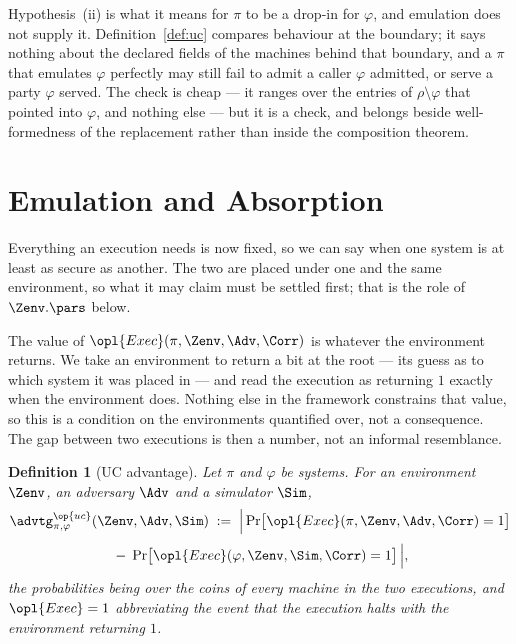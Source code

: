 \documentclass[10pt,oneside,openany]{book}
\theoremstyle{accentdef}
\newtheorem{definition}{Definition}[chapter]
\theoremstyle{accentplain}
\begin{document}
Hypothesis~(ii) is what it means for $\pi$ to be a drop-in for $\varphi$, and emulation does not
supply it. Definition~\ref{def:uc} compares behaviour at the boundary; it says nothing about the
declared fields of the machines behind that boundary, and a $\pi$ that emulates $\varphi$
perfectly may still fail to admit a caller $\varphi$ admitted, or serve a party $\varphi$ served.
The check is cheap --- it ranges over the entries of $\rho \setminus \varphi$ that pointed into
$\varphi$, and nothing else --- but it is a check, and belongs beside well-formedness of the
replacement rather than inside the composition theorem.

\section{Emulation and Absorption}\label{sec:emabs}


Everything an execution needs is now fixed, so we can say when one system is at least as secure
as another. The two are placed under one and the same environment, so what it may claim must be
settled first; that is the role of $\Zenv.\pars$ below.

The value of $\opl{Exec}(\pi,\Zenv,\Adv,\Corr)$ is whatever the environment returns. We take an
environment to return a bit at the root --- its guess as to which system it was placed in --- and
read the execution as returning $1$ exactly when the environment does. Nothing else in the
framework constrains that value, so this is a condition on the environments quantified over, not a
consequence. The gap between two executions is then a number, not an informal resemblance.

\begin{definition}[UC advantage]\label{def:adv}
Let $\pi$ and $\varphi$ be systems. For an environment $\Zenv$, an adversary $\Adv$ and a simulator $\Sim$,
\[
  \begin{gathered}
  \advtg^{\op{uc}}_{\pi,\varphi}(\Zenv,\Adv,\Sim)
  \;:=\;
  \Bigl|\, \Pr\bigl[\opl{Exec}(\pi,\Zenv,\Adv,\Corr) = 1\bigr] \\[3pt]
  \;-\; \Pr\bigl[\opl{Exec}(\varphi,\Zenv,\Sim,\Corr) = 1\bigr] \,\Bigr| ,
  \end{gathered}
\]
the probabilities being over the coins of every machine in the two executions, and
$\opl{Exec} = 1$ abbreviating the event that the execution halts with the environment
returning $1$.
\end{definition}
\end{document}
